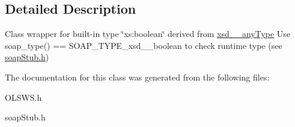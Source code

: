 \subsection{Detailed Description}
Class wrapper for built-\/in type \char`\"{}xs:boolean\char`\"{} derived from \hyperlink{classxsd____anyType}{xsd\_\-\_\-anyType} Use soap\_\-type() == SOAP\_\-TYPE\_\-xsd\_\-\_\-boolean to check runtime type (see \hyperlink{soapStub_8h_source}{soapStub.h}) 

The documentation for this class was generated from the following files:\begin{DoxyCompactItemize}
\item 
OLSWS.h\item 
soapStub.h\end{DoxyCompactItemize}
